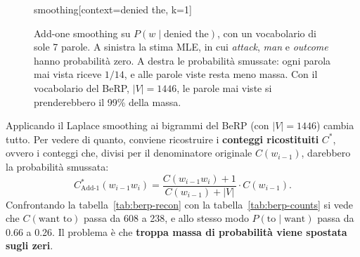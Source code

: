 \begin{figure}[htbp]
\centering
\begin{widget}{smoothing}[context=denied the, k=1]
\end{widget}
\caption{Add-one smoothing su $P(w \mid \text{denied the})$, con un vocabolario di sole 7 parole. A sinistra la stima MLE, in cui \textit{attack}, \textit{man} e \textit{outcome} hanno probabilità zero. A destra le probabilità smussate: ogni parola mai vista riceve $1/14$, e alle parole viste resta meno massa. Con il vocabolario del BeRP, $|V| = 1446$, le parole mai viste si prenderebbero il 99\% della massa.}
\label{fig:smoothing}
\end{figure}

Applicando il Laplace smoothing ai bigrammi del BeRP (con $|V| = 1446$) cambia tutto. Per vedere di quanto, conviene ricostruire i \textbf{conteggi ricostituiti} $C^*$, ovvero i conteggi che, divisi per il denominatore originale $C(w_{i-1})$, darebbero la probabilità smussata:
\begin{equation}
C^*_{\text{Add-1}}(w_{i-1} w_i) = \frac{C(w_{i-1} w_i) + 1}{C(w_{i-1}) + |V|} \cdot C(w_{i-1}).
\end{equation}
Confrontando la tabella~\ref{tab:berp-recon} con la tabella~\ref{tab:berp-counts} si vede che $C(\text{want to})$ passa da 608 a 238, e allo stesso modo $P(\text{to} \mid \text{want})$ passa da 0.66 a 0.26. Il problema è che \textbf{troppa massa di probabilità viene spostata sugli zeri}.


